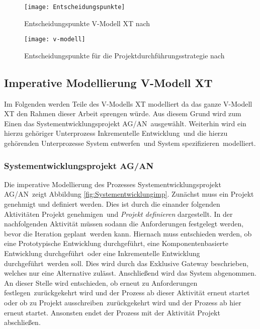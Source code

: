  
 
 \begin{figure}[!htbp]
\begin{center}
  \texttt{[image: Entscheidungspunkte]} %
  \caption{Entscheidungspunkte V-Modell XT nach \cite{2004vmodell}}
  \label{fig:entscheidungspunkte}
\end{center}
\end{figure}
 
\begin{sidewaysfigure}[!htbp]
\begin{center}
  \texttt{[image: v-modell]} %
  \caption{Entscheidungspunkte für die Projektdurchführungsstrategie nach \cite{2004vmodell}}
  \label{fig:v-modell}
\end{center}
\end{sidewaysfigure}


\clearpage

\subsection{Imperative Modellierung V-Modell XT}

Im Folgenden werden Teile des V-Modells XT modelliert da das ganze V-Modell XT den Rahmen dieser Arbeit sprengen würde. Aus diesem Grund wird zum Einen das \grqq Systementwicklungsprojekt AG/AN\grqq \ ausgewählt. Weiterhin wird ein hierzu gehöriger Unterprozess \grqq Inkrementelle Entwicklung\grqq \ und die hierzu gehörenden Unterprozesse \grqq System entwerfen\grqq \ und \grqq System spezifizieren\grqq \ modelliert.

\subsubsection{Systementwicklungsprojekt AG/AN}


Die imperative Modellierung des Prozesses \grqq Systementwicklungsprojekt AG/AN\grqq \ zeigt Abbildung \ref{fig:Systementwicklungimp}. \newline
Zunächst muss ein Projekt genehmigt und definiert werden. Dies ist durch die einander folgenden Aktivitäten \grqq Projekt genehmigen\grqq \ und \textit{Projekt definieren} dargestellt.\newline
In der nachfolgenden Aktivität müssen sodann die \grqq Anforderungen festgelegt werden\grqq, bevor die \grqq Iteration geplant\grqq \ werden kann. \newline
Hiernach muss entschieden werden, ob eine \grqq Prototypische Entwicklung durchgeführt\grqq, eine \grqq Komponentenbasierte Entwicklung durchgeführt\grqq \ oder eine \grqq Inkrementelle Entwicklung durchgeführt\grqq \ werden soll. Dies wird durch das Exklusive Gateway beschrieben, welches nur eine Alternative zulässt.\newline
Anschließend wird das \grqq System abgenommen\grqq. An dieser Stelle wird entschieden, ob erneut zu \grqq Anforderungen festlegen\grqq \ zurückgekehrt wird und der Prozess ab dieser Aktivität erneut startet oder ob zu \grqq Projekt ausschreiben\grqq \ zurückgekehrt wird und der Prozess ab hier erneut startet. Ansonsten endet der Prozess mit der Aktivität \grqq Projekt abschließen\grqq.


